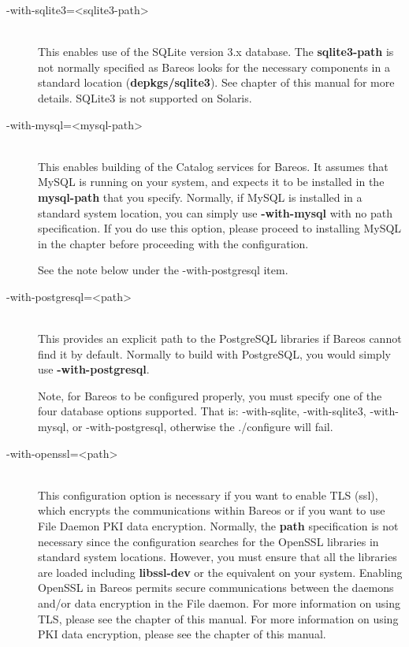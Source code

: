 \begin{description}
\item [ {-}{\-}with-sqlite3={\textless}sqlite3-path{\textgreater}] \hfill \\
This enables use of the SQLite version 3.x database.  The {\bf
sqlite3-path} is not normally specified as Bareos looks for the
necessary components in a standard location ({\bf depkgs/sqlite3}).  See
 chapter of
this manual for more details. SQLite3 is not supported on Solaris.

\item [ {-}{\-}with-mysql={\textless}mysql-path{\textgreater}] \hfill \\
This enables building of the Catalog services for Bareos.  It assumes
that MySQL is running on your system, and expects it to be installed in
the {\bf mysql-path} that you specify.  Normally, if MySQL is installed
in a standard system location, you can simply use {\bf {-}{\-}with-mysql}
with no path specification.  If you do use this option, please proceed
to installing MySQL in the  chapter before proceeding with the configuration.

See the note below under the {-}{\-}with-postgresql item.

\item [ {-}{\-}with-postgresql={\textless}path{\textgreater}] \hfill \\
This provides an explicit path to the PostgreSQL libraries if Bareos
cannot find it by default.  Normally to build with PostgreSQL, you would
simply use {\bf {-}{\-}with-postgresql}.

Note, for Bareos to be configured properly, you must specify one
of the four database options supported.  That is:
{-}{\-}with-sqlite, {-}{\-}with-sqlite3, {-}{\-}with-mysql, or
{-}{\-}with-postgresql, otherwise the ./configure will fail.

\item [ {-}{\-}with-openssl={\textless}path{\textgreater}] \hfill \\
This configuration option is necessary if you want to enable TLS (ssl),
which encrypts the communications within
Bareos or if you want to use File Daemon PKI data encryption.
Normally, the {\bf path} specification is not necessary since
the configuration searches for the OpenSSL libraries in standard system
locations. However, you must ensure that all the libraries are
loaded including {\bf libssl-dev} or the equivalent on your
system. Enabling OpenSSL in Bareos permits secure communications
between the daemons and/or data encryption in the File daemon.
For more information on using TLS, please see the
 chapter
of this manual.
For more information on using PKI data encryption, please see the
chapter of this manual.


\end{description}
